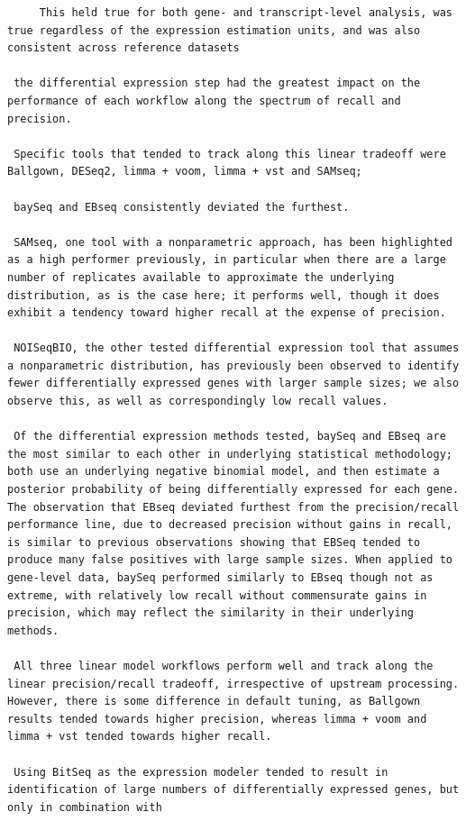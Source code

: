 \documentclass[
]{book}
\begin{document}
\begin{enumerate}
\begin{verbatim}
     This held true for both gene- and transcript-level analysis, was true regardless of the expression estimation units, and was also consistent across reference datasets

 the differential expression step had the greatest impact on the performance of each workflow along the spectrum of recall and precision.

 Specific tools that tended to track along this linear tradeoff were Ballgown, DESeq2, limma + voom, limma + vst and SAMseq;

 baySeq and EBseq consistently deviated the furthest.

 SAMseq, one tool with a nonparametric approach, has been highlighted as a high performer previously, in particular when there are a large number of replicates available to approximate the underlying distribution, as is the case here; it performs well, though it does exhibit a tendency toward higher recall at the expense of precision.

 NOISeqBIO, the other tested differential expression tool that assumes a nonparametric distribution, has previously been observed to identify fewer differentially expressed genes with larger sample sizes; we also observe this, as well as correspondingly low recall values.

 Of the differential expression methods tested, baySeq and EBseq are the most similar to each other in underlying statistical methodology; both use an underlying negative binomial model, and then estimate a posterior probability of being differentially expressed for each gene. The observation that EBseq deviated furthest from the precision/recall performance line, due to decreased precision without gains in recall, is similar to previous observations showing that EBSeq tended to produce many false positives with large sample sizes. When applied to gene-level data, baySeq performed similarly to EBseq though not as extreme, with relatively low recall without commensurate gains in precision, which may reflect the similarity in their underlying methods.

 All three linear model workflows perform well and track along the linear precision/recall tradeoff, irrespective of upstream processing. However, there is some difference in default tuning, as Ballgown results tended towards higher precision, whereas limma + voom and limma + vst tended towards higher recall.

 Using BitSeq as the expression modeler tended to result in identification of large numbers of differentially expressed genes, but only in combination with


\end{verbatim}
\end{enumerate}
\end{document}
